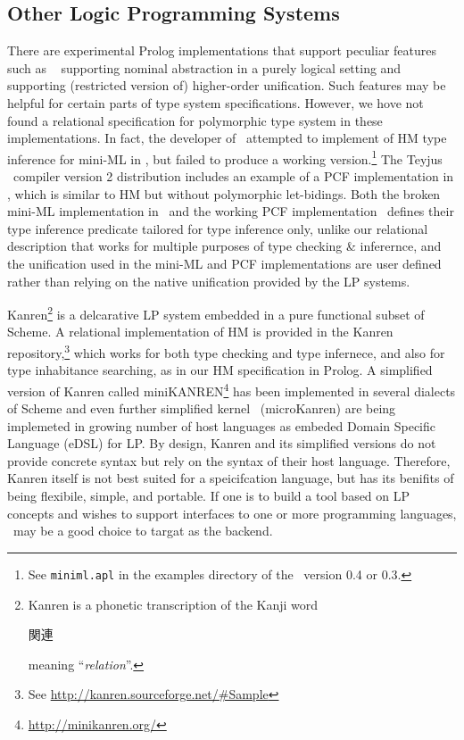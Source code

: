 \subsection{Other Logic Programming Systems}\label{ssec:otherLP}
There are experimental Prolog implementations that support peculiar features
such as \aProlog\ \cite{cheney04iclp} supporting nominal abstraction in a purely
logical setting and \lProlog\ \cite{nadathur99cade} supporting (restricted
version of) higher-order unification. Such features may be helpful for certain
parts of type system specifications. However, we hove not found a relational
specification for polymorphic type system in these implementations. In fact,
the developer of \aProlog\ attempted to implement of HM type inference for
mini-ML in \aProlog, but failed to produce a working version.\footnote{
	See \texttt{miniml.apl} in the examples directory of
	the \aProlog\ version 0.4 or 0.3.}
The Teyjus \lProlog\ compiler version 2 distribution includes an example of
a PCF implementation in \lProlog, which is similar to HM but without
polymorphic let-bidings. Both the broken mini-ML implementation in \aProlog\ and
the working PCF implementation \lProlog\ defines their type inference predicate
tailored for type inference only, unlike our relational description that works
for multiple purposes of type checking \& inferernce, and the unification used
in the mini-ML and PCF implementations are user defined rather than relying on
the native unification provided by the LP systems.

Kanren\footnote{Kanren is a phonetic transcription of the Kanji word
	\begin{CJK}{UTF8}{min}{関連}\end{CJK} meaning ``\emph{relation}''.}
is a delcarative LP system embedded in a pure functional subset of Scheme.
A relational implementation of HM is provided in
the Kanren repository,\footnote{See \url{http://kanren.sourceforge.net/\#Sample}}
which works for both type checking and type infernece, and also for
type inhabitance searching, as in our HM specification in Prolog.
A simplified version of Kanren called miniKANREN\footnote{
	\url{http://minikanren.org/} } has been implemented in several dialects
of Scheme and even further simplified kernel \muKanren\ (microKanren)
\cite{microKanren} are being implemeted in growing number of host languages as
embeded Domain Specific Language (eDSL) for LP. By design, Kanren and its
simplified versions do not provide concrete syntax but rely on the syntax of
their host language. Therefore, Kanren itself is not best suited for
a speicifcation language, but has its benifits of being flexibile, simple, and
portable. If one is to build a tool based on LP concepts and wishes to support
interfaces to one or more programming languages, \muKanren\ may be a good choice
to targat as the backend.

